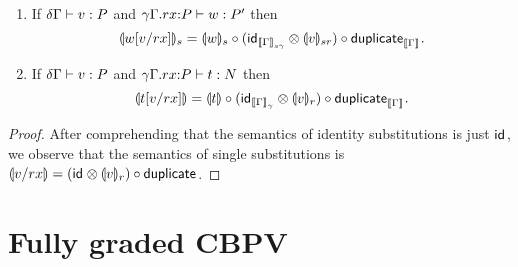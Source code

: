 \documentclass[acmsmall,review,anonymous]{acmart}\settopmatter{printfolios=true,printccs=false,printacmref=false}
\begin{document}
\begin{corollary}
  \label{cor:semsinglesub}
  \bla
  \begin{enumerate}
  \item If $\qValTy \delta \Gamma v P$ and
      $\oCompTy {\qext \gamma \Gamma r x P} w {P'}$
      then
\[
  \denv {\qsubst v r x w} s = \denv w s
    \comp (\tid[\Den\Gamma{s\gamma}] \otimes \denv v {sr})
    \comp \duplicate[\den\Gamma]
  .
\]
  \item If $\qValTy \delta \Gamma v P$ and
      $\oCompTy {\qext \gamma \Gamma r x P} t {N}$
      then
\[
  \dent{\qsubst v r x t} = \dent t
    \comp (\tid[\Den\Gamma \gamma] \otimes \denv v r)
    \comp \duplicate[\den\Gamma]
  .
\]
  \end{enumerate}
\end{corollary}
\begin{proof}
  After comprehending that the semantics of identity substitutions is
  just $\tid$, we observe that the semantics of single substitutions
  is $\dent {v/rx} = (\tid \otimes \denv v r) \comp \duplicate$.
\end{proof}





\section{Fully graded CBPV}
\label{sec:full-cbpv}

\newcommand{\peCompTy}[5]{(#1)#2 \vdash #3 : #5 \mid #4}
\newcommand{\qeCompTy}[5]{#1#2 \vdash #3 : #5 \mid #4}
\newcommand{\eext}[4]{#1\mathbin.#2:#4|#3}
\newcommand{\qeext}[6]{#1#2\mathbin.#3#4:#6|#5}
\end{document}
